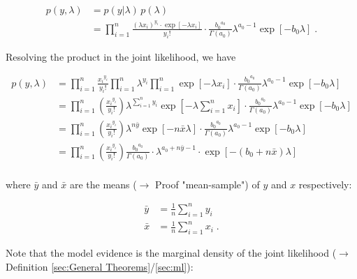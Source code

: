 \documentclass[a4paper,12pt,twoside]{book}
\begin{document}
\begin{equation} \label{eq:poissexp-lme-Poiss-exp-JL-s1}
\begin{split}
p(y,\lambda) &= p(y|\lambda) \, p(\lambda) \\
&= \prod_{i=1}^n \frac{(\lambda x_i)^{y_i} \cdot \exp\left[-\lambda x_i\right]}{y_i !} \cdot \frac{ {b_0}^{a_0}}{\Gamma(a_0)} \lambda^{a_0-1} \exp[-b_0 \lambda] \; .
\end{split}
\end{equation}

Resolving the product in the joint likelihood, we have

\begin{equation} \label{eq:poissexp-lme-Poiss-exp-JL-s2}
\begin{split}
p(y,\lambda) &= \prod_{i=1}^n \frac{ {x_i}^{y_i}}{y_i !} \prod_{i=1}^n \lambda^{y_i} \prod_{i=1}^n \exp\left[-\lambda x_i\right] \cdot \frac{ {b_0}^{a_0}}{\Gamma(a_0)} \lambda^{a_0-1} \exp[-b_0 \lambda] \\
&= \prod_{i=1}^n \left(\frac{ {x_i}^{y_i}}{y_i !}\right) \lambda^{\sum_{i=1}^n y_i} \exp\left[-\lambda \sum_{i=1}^n x_i\right] \cdot \frac{ {b_0}^{a_0}}{\Gamma(a_0)} \lambda^{a_0-1} \exp[-b_0 \lambda] \\
&= \prod_{i=1}^n \left(\frac{ {x_i}^{y_i}}{y_i !}\right) \lambda^{n \bar{y}} \exp\left[-n \bar{x} \lambda\right] \cdot \frac{ {b_0}^{a_0}}{\Gamma(a_0)} \lambda^{a_0-1} \exp[-b_0 \lambda] \\
&= \prod_{i=1}^n \left(\frac{ {x_i}^{y_i}}{y_i !}\right) \frac{ {b_0}^{a_0}}{\Gamma(a_0)}  \cdot \lambda^{a_0 + n \bar{y} - 1} \cdot \exp\left[-(b_0 + n \bar{x}) \lambda\right] \\
\end{split}
\end{equation}

where $\bar{y}$ and $\bar{x}$ are the means ($\rightarrow$ Proof "mean-sample") of $y$ and $x$ respectively:

\begin{equation} \label{eq:poissexp-lme-xy-mean}
\begin{split}
\bar{y} &= \frac{1}{n} \sum_{i=1}^n y_i \\
\bar{x} &= \frac{1}{n} \sum_{i=1}^n x_i \; .
\end{split}
\end{equation}

Note that the model evidence is the marginal density of the joint likelihood ($\rightarrow$ Definition \ref{sec:General Theorems}/\ref{sec:ml}):
\end{document}
